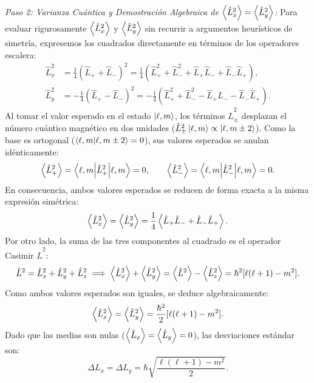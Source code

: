 \begin{ejemplobox}
    \textit{Paso 2: Varianza Cuántica y Demostración Algebraica de $\left\langle \hat{L}_x^2 \right\rangle = \left\langle \hat{L}_y^2 \right\rangle$:}
    Para evaluar rigurosamente $\left\langle \hat{L}_x^2 \right\rangle$ y $\left\langle \hat{L}_y^2 \right\rangle$ sin recurrir a argumentos heurísticos de simetría, expresemos los cuadrados directamente en términos de los operadores escalera:
    \begin{align}
        \hat{L}_x^2 &= \frac{1}{4}\left(\hat{L}_+ + \hat{L}_-\right)^2 = \frac{1}{4}\left( \hat{L}_+^2 + \hat{L}_-^2 + \hat{L}_+\hat{L}_- + \hat{L}_-\hat{L}_+ \right), \\
        \hat{L}_y^2 &= -\frac{1}{4}\left(\hat{L}_+ - \hat{L}_-\right)^2 = -\frac{1}{4}\left( \hat{L}_+^2 + \hat{L}_-^2 - \hat{L}_+\hat{L}_- - \hat{L}_-\hat{L}_+ \right).
    \end{align}
    Al tomar el valor esperado en el estado $\left| \ell, m \right\rangle$, los términos $\hat{L}_\pm^2$ desplazan el número cuántico magnético en dos unidades ($\hat{L}_\pm^2\left| \ell, m \right\rangle \propto \left| \ell, m \pm 2 \right\rangle$). Como la base es ortogonal ($\left\langle \ell, m \middle| \ell, m \pm 2 \right\rangle = 0$), sus valores esperados se anulan idénticamente:
    \begin{equation}
        \left\langle \hat{L}_+^2 \right\rangle = \left\langle \ell, m \middle| \hat{L}_+^2 \middle| \ell, m \right\rangle = 0, \qquad \left\langle \hat{L}_-^2 \right\rangle = \left\langle \ell, m \middle| \hat{L}_-^2 \middle| \ell, m \right\rangle = 0.
    \end{equation}
    En consecuencia, ambos valores esperados se reducen de forma exacta a la misma expresión simétrica:
    \begin{equation}
        \left\langle \hat{L}_x^2 \right\rangle = \left\langle \hat{L}_y^2 \right\rangle = \frac{1}{4}\left\langle \hat{L}_+\hat{L}_- + \hat{L}_-\hat{L}_+ \right\rangle.
    \end{equation}
    Por otro lado, la suma de las tres componentes al cuadrado es el operador Casimir $\hat{L}^2$:
    \begin{equation}
        \hat{L}^2 = \hat{L}_x^2 + \hat{L}_y^2 + \hat{L}_z^2 \implies \left\langle \hat{L}_x^2 \right\rangle + \left\langle \hat{L}_y^2 \right\rangle = \left\langle \hat{L}^2 \right\rangle - \left\langle \hat{L}_z^2 \right\rangle = \hbar^2[\ell(\ell+1) - m^2].
    \end{equation}
    Como ambos valores esperados son iguales, se deduce algebraicamente:
    \begin{equation}
        \left\langle \hat{L}_x^2 \right\rangle = \left\langle \hat{L}_y^2 \right\rangle = \frac{\hbar^2}{2}[\ell(\ell+1) - m^2].
    \end{equation}
    Dado que las medias son nulas ($\left\langle \hat{L}_x \right\rangle = \left\langle \hat{L}_y \right\rangle = 0$), las desviaciones estándar son:
    \begin{equation}
        \Delta L_x = \Delta L_y = \hbar\sqrt{\frac{\ell(\ell+1) - m^2}{2}}.
    \end{equation}


\end{ejemplobox}
